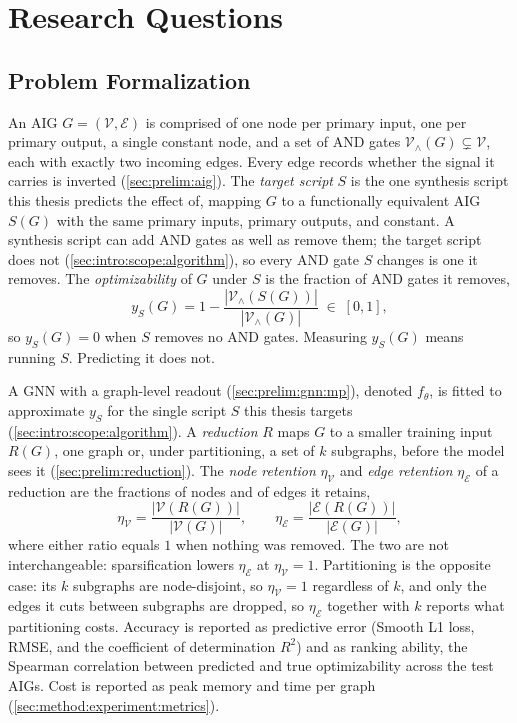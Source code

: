 \section{Research Questions}
\label{sec:intro:rqs}

\subsection{Problem Formalization}
\label{sec:intro:formalization}
An AIG $G = (\mathcal{V}, \mathcal{E})$ is comprised of one node per primary input, one per primary
output, a single constant node, and a set of AND gates $\mathcal{V}_{\wedge}(G) \subsetneq
\mathcal{V}$, each with exactly two incoming edges. Every edge records whether the signal it
carries is inverted (\ref{sec:prelim:aig}). The \emph{target script} $S$ is the one synthesis
script this thesis predicts the effect of, mapping $G$ to a functionally equivalent AIG
$S(G)$ with the same primary inputs, primary outputs, and constant. A synthesis script can
add AND gates as well as remove them; the target script does not
(\ref{sec:intro:scope:algorithm}), so every AND gate $S$ changes is one it removes.
The \emph{optimizability} of $G$ under $S$ is the fraction of AND gates it removes,
\begin{equation}
    y_S(G) = 1 - \frac{\left| \mathcal{V}_{\wedge}(S(G)) \right|}{\left| \mathcal{V}_{\wedge}(G) \right|}
    \;\in\; [0, 1],
    \label{eq:intro:target}
\end{equation}
so $y_S(G) = 0$ when $S$ removes no AND gates. Measuring $y_S(G)$ means running $S$.
Predicting it does not.

A GNN with a graph-level readout (\ref{sec:prelim:gnn:mp}), denoted $f_\theta$, is fitted to
approximate $y_S$ for the single script $S$ this thesis targets
(\ref{sec:intro:scope:algorithm}). A \emph{reduction} $R$ maps $G$ to a smaller training
input $R(G)$, one graph or, under partitioning, a set of $k$ subgraphs, before the model sees it
(\ref{sec:prelim:reduction}). The \emph{node retention} $\eta_{\mathcal{V}}$ and \emph{edge
retention} $\eta_{\mathcal{E}}$ of a reduction are the fractions of nodes and of edges it
retains,
\begin{equation}
    \eta_{\mathcal{V}} = \frac{\left| \mathcal{V}(R(G)) \right|}{\left| \mathcal{V}(G) \right|},
    \qquad
    \eta_{\mathcal{E}} = \frac{\left| \mathcal{E}(R(G)) \right|}{\left| \mathcal{E}(G) \right|},
    \label{eq:intro:retention}
\end{equation}
where either ratio equals $1$ when nothing was removed. The two are not interchangeable:
sparsification lowers $\eta_{\mathcal{E}}$ at $\eta_{\mathcal{V}} = 1$. Partitioning is the
opposite case: its $k$ subgraphs are node-disjoint, so $\eta_{\mathcal{V}} = 1$ regardless of
$k$, and only the edges it cuts between subgraphs are dropped, so $\eta_{\mathcal{E}}$
together with $k$ reports what partitioning costs.
Accuracy is reported as predictive error (Smooth L1 loss, RMSE, and the coefficient of
determination $R^2$) and as ranking ability, the Spearman correlation between predicted and
true optimizability across the test AIGs. Cost is reported as peak memory and time per graph
(\ref{sec:method:experiment:metrics}).

